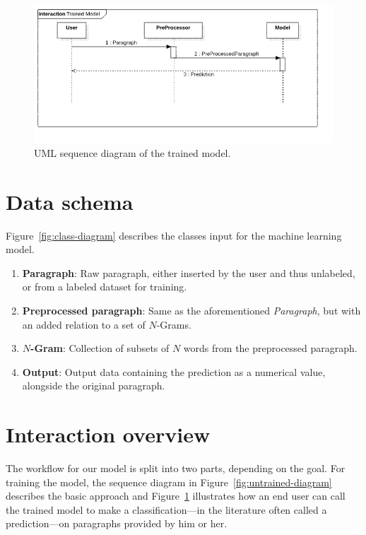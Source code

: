 \documentclass[a4paper]{article}
\begin{document}
\begin{figure}
    \includegraphics[width=1\textwidth]{figures/png/Collaboration1!Interaction1!TrainedModel_1.png}
    \caption{UML sequence diagram of the trained model.}
    \label{fig:trained-diagram}
\end{figure}

\section{Data schema}
Figure~\ref{fig:class-diagram} describes the classes input for the machine learning model. 

\begin{enumerate}
    \item \textbf{Paragraph}: Raw paragraph, either inserted by the user and thus unlabeled, or from a labeled dataset for training.
    \item \textbf{Preprocessed paragraph}: Same as the aforementioned \emph{Paragraph}, but with an added relation to a set of $N$-Grams. 
    \item \textbf{$N$-Gram}: Collection of subsets of $N$ words from the preprocessed paragraph. 
    \item \textbf{Output}: Output data containing the prediction as a numerical value, alongside the original paragraph.
\end{enumerate}

\section{Interaction overview}
The workflow for our model is split into two parts, depending on the goal. For training the model, the sequence diagram in Figure~\ref{fig:untrained-diagram} describes the basic approach and Figure~\ref{fig:trained-diagram} illustrates how an end user can call the trained model to make a classification---in the literature often called a prediction---on paragraphs provided by him or her. 
\end{document}
